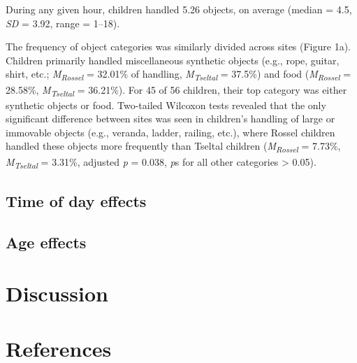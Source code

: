 \documentclass[10pt, letterpaper]{article}
\begin{document}
During any given hour, children handled 5.26 objects, on average (median
= 4.5, \emph{SD} = 3.92, range = 1--18).

The frequency of object categories was similarly divided across sites
(Figure 1a). Children primarily handled miscellaneous synthetic objects
(e.g., rope, guitar, shirt, etc.; \emph{M}\textsubscript{\emph{Rossel}}
= 32.01\% of handling, \emph{M}\textsubscript{\emph{Tseltal}} = 37.5\%)
and food (\emph{M}\textsubscript{\emph{Rossel}} = 28.58\%,
\emph{M}\textsubscript{\emph{Tseltal}} = 36.21\%). For 45 of 56
children, their top category was either synthetic objects or food.
Two-tailed Wilcoxon tests revealed that the only significant difference
between sites was seen in children's handling of large or immovable
objects (e.g., veranda, ladder, railing, etc.), where Rossel children
handled these objects more frequently than Tseltal children
(\emph{M}\textsubscript{\emph{Rossel}} = 7.73\%,
\emph{M}\textsubscript{\emph{Tseltal}} = 3.31\%, adjusted \emph{p} =
0.038, \emph{p}s for all other categories \textgreater{} 0.05).

\hypertarget{time-of-day-effects}{%
\subsection{Time of day effects}\label{time-of-day-effects}}

\hypertarget{age-effects}{%
\subsection{Age effects}\label{age-effects}}

\hypertarget{discussion}{%
\section{Discussion}\label{discussion}}

\hypertarget{references}{%
\section{References}\label{references}}

\setlength{\parindent}{-0.1in} 
\setlength{\leftskip}{0.125in}

\noindent


\end{document}
